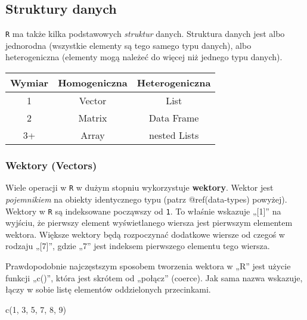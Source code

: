 \documentclass[
]{article}
\newenvironment{Shaded}{\begin{snugshade}}{\end{snugshade}}
\newcommand{\DecValTok}[1]{\textcolor[rgb]{0.00,0.00,0.81}{#1}}
\newcommand{\FunctionTok}[1]{\textcolor[rgb]{0.00,0.00,0.00}{#1}}
\newcommand{\NormalTok}[1]{#1}
\begin{document}
\hypertarget{struktury-danych}{%
\subsection{Struktury danych}\label{struktury-danych}}

\texttt{R} ma także kilka podstawowych \emph{struktur} danych. Struktura
danych jest albo jednorodna (wszystkie elementy są tego samego typu
danych), albo heterogeniczna (elementy mogą należeć do więcej niż
jednego typu danych).

\begin{longtable}[]{@{}ccc@{}}
\toprule
Wymiar & \textbf{Homogeniczna} & \textbf{Heterogeniczna} \\
\midrule
\endhead
1 & Vector & List \\
2 & Matrix & Data Frame \\
3+ & Array & nested Lists \\
\bottomrule
\end{longtable}

\hypertarget{wektory-vectors}{%
\subsubsection{Wektory (Vectors)}\label{wektory-vectors}}

Wiele operacji w \texttt{R} w dużym stopniu wykorzystuje
\textbf{wektory}. Wektor jest \emph{pojemnikiem} na obiekty identycznego
typu (patrz @ref(data-types) powyżej). Wektory w \texttt{R} są
indeksowane począwszy od \texttt{1}. To właśnie wskazuje „{[}1{]}'' na
wyjściu, że pierwszy element wyświetlanego wiersza jest pierwszym
elementem wektora. Większe wektory będą rozpoczynać dodatkowe wiersze od
czegoś w rodzaju „{[}7{]}'', gdzie „7'' jest indeksem pierwszego
elementu tego wiersza.

Prawdopodobnie najczęstszym sposobem tworzenia wektora w „R'' jest
użycie funkcji „c()'', która jest skrótem od „połącz'' (coerce). Jak
sama nazwa wskazuje, łączy w sobie listę elementów oddzielonych
przecinkami.

\begin{Shaded}
\begin{Highlighting}[]
\FunctionTok{c}\NormalTok{(}\DecValTok{1}\NormalTok{, }\DecValTok{3}\NormalTok{, }\DecValTok{5}\NormalTok{, }\DecValTok{7}\NormalTok{, }\DecValTok{8}\NormalTok{, }\DecValTok{9}\NormalTok{)}
\end{Highlighting}
\end{Shaded}
\end{document}
